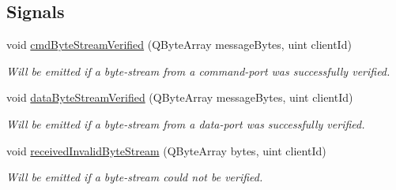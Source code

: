 \subsection*{Signals}
\begin{DoxyCompactItemize}
\item 
void \hyperlink{class_server_appl_1_1_byte_stream_verifier_a7c945c8c2eb698ba87ae445d9f5bd9bb}{cmd\+Byte\+Stream\+Verified} (Q\+Byte\+Array message\+Bytes, uint client\+Id)
\begin{DoxyCompactList}\small\item\em Will be emitted if a byte-\/stream from a command-\/port was successfully verified. \end{DoxyCompactList}\item 
void \hyperlink{class_server_appl_1_1_byte_stream_verifier_a32ce64ff8801b564a3216344fb8382a2}{data\+Byte\+Stream\+Verified} (Q\+Byte\+Array message\+Bytes, uint client\+Id)
\begin{DoxyCompactList}\small\item\em Will be emitted if a byte-\/stream from a data-\/port was successfully verified. \end{DoxyCompactList}\item 
void \hyperlink{class_server_appl_1_1_byte_stream_verifier_a5ce75d95b934a123f6a4a33d00f99f7d}{received\+Invalid\+Byte\+Stream} (Q\+Byte\+Array bytes, uint client\+Id)
\begin{DoxyCompactList}\small\item\em Will be emitted if a byte-\/stream could not be verified. \end{DoxyCompactList}\end{DoxyCompactItemize}
